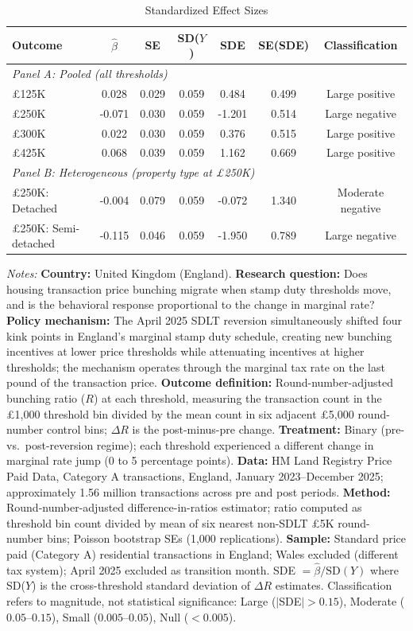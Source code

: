 \begin{table}[htbp]
\centering
\caption{Standardized Effect Sizes}
\label{tab:sde}
\begin{tabular}{lcccccc}
\hline\hline
Outcome & $\hat{\beta}$ & SE & SD($Y$) & SDE & SE(SDE) & Classification \\
\hline
\multicolumn{7}{l}{\textit{Panel A: Pooled (all thresholds)}} \\
\pounds 125K & 0.028 & 0.029 & 0.059 & 0.484 & 0.499 & Large positive \\
\pounds 250K & -0.071 & 0.030 & 0.059 & -1.201 & 0.514 & Large negative \\
\pounds 300K & 0.022 & 0.030 & 0.059 & 0.376 & 0.515 & Large positive \\
\pounds 425K & 0.068 & 0.039 & 0.059 & 1.162 & 0.669 & Large positive \\
\hline
\multicolumn{7}{l}{\textit{Panel B: Heterogeneous (property type at \pounds 250K)}} \\
\pounds 250K: Detached & -0.004 & 0.079 & 0.059 & -0.072 & 1.340 & Moderate negative \\
\pounds 250K: Semi-detached & -0.115 & 0.046 & 0.059 & -1.950 & 0.789 & Large negative \\
\hline\hline
\end{tabular}
\begin{tablenotes}
\item \textit{Notes:} \textbf{Country:} United Kingdom (England). \textbf{Research question:} Does housing transaction price bunching migrate when stamp duty thresholds move, and is the behavioral response proportional to the change in marginal rate? \textbf{Policy mechanism:} The April 2025 SDLT reversion simultaneously shifted four kink points in England's marginal stamp duty schedule, creating new bunching incentives at lower price thresholds while attenuating incentives at higher thresholds; the mechanism operates through the marginal tax rate on the last pound of the transaction price. \textbf{Outcome definition:} Round-number-adjusted bunching ratio ($R$) at each threshold, measuring the transaction count in the \pounds 1,000 threshold bin divided by the mean count in six adjacent \pounds 5,000 round-number control bins; $\Delta R$ is the post-minus-pre change. \textbf{Treatment:} Binary (pre- vs.\ post-reversion regime); each threshold experienced a different change in marginal rate jump (0 to 5 percentage points). \textbf{Data:} HM Land Registry Price Paid Data, Category A transactions, England, January 2023--December 2025; approximately 1.56 million transactions across pre and post periods. \textbf{Method:} Round-number-adjusted difference-in-ratios estimator; ratio computed as threshold bin count divided by mean of six nearest non-SDLT \pounds 5K round-number bins; Poisson bootstrap SEs (1,000 replications). \textbf{Sample:} Standard price paid (Category A) residential transactions in England; Wales excluded (different tax system); April 2025 excluded as transition month. SDE $= \hat{\beta} / \text{SD}(Y)$ where SD($Y$) is the cross-threshold standard deviation of $\Delta R$ estimates. Classification refers to magnitude, not statistical significance: Large ($|$SDE$| > 0.15$), Moderate ($0.05$--$0.15$), Small ($0.005$--$0.05$), Null ($< 0.005$).

\end{tablenotes}
\end{table}
